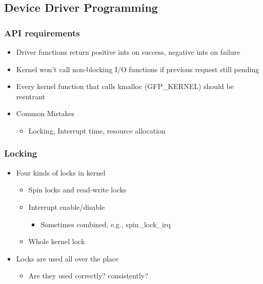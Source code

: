 \subsection{Device Driver Programming} %
\begin{frame}[fragile]
    \frametitle{API requirements}
    \begin{itemize}
        \item Driver functions return positive ints on success, negative ints on failure
        \item Kernel won’t call non-blocking I/O functions if previous request still pending
        \item Every kernel function that calls kmalloc (GFP_KERNEL) should be reentrant
        \item Common Mistakes
        \begin{itemize}
            \item Locking, Interrupt time, resource allocation
        \end{itemize}
    \end{itemize}
\end{frame}
% 
% 
% 
% 
\begin{frame}[fragile]
    \frametitle{Locking}
    \begin{itemize}
        \item Four kinds of locks in kernel
        \begin{itemize}
            \item Spin locks and read-write locks
            \item Interrupt enable/disable
            \begin{itemize}
                \item Sometimes combined, e.g., spin_lock_irq
            \end{itemize}
            \item Whole kernel lock
        \end{itemize}
        \item Locks are used all over the place
        \begin{itemize}
            \item Are they used correctly?  consistently?
        \end{itemize}
    \end{itemize}
\end{frame}
